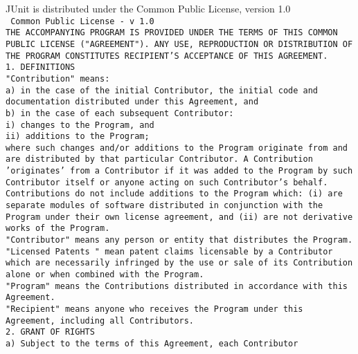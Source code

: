 
\setlength{\baselineskip}{\oldbaselineskip}
\noindent
JUnit is distributed under the Common Public License, version 1.0
\\

\setlength{\baselineskip}{0.5\oldbaselineskip}
{\tiny\tt
\noindent
Common Public License - v 1.0
\\[4pt]
THE ACCOMPANYING PROGRAM IS PROVIDED UNDER THE TERMS OF THIS COMMON
PUBLIC LICENSE ("AGREEMENT"). ANY USE, REPRODUCTION OR DISTRIBUTION OF
THE PROGRAM CONSTITUTES RECIPIENT'S ACCEPTANCE OF THIS AGREEMENT.
\\[4pt]
1. DEFINITIONS
\\[4pt]
"Contribution" means:
\\[4pt]
      a) in the case of the initial Contributor, the initial code and
      documentation distributed under this Agreement, and
\\[4pt]
      b) in the case of each subsequent Contributor:
\\[4pt]
      i) changes to the Program, and
\\[4pt]
      ii) additions to the Program;
\\[4pt]
      where such changes and/or additions to the Program originate
      from and are distributed by that particular Contributor. A
      Contribution 'originates' from a Contributor if it was added to
      the Program by such Contributor itself or anyone acting on such
      Contributor's behalf. Contributions do not include additions to
      the Program which: (i) are separate modules of software
      distributed in conjunction with the Program under their own
      license agreement, and (ii) are not derivative works of the
      Program.
\\[4pt]
"Contributor" means any person or entity that distributes the Program.
\\[4pt]
"Licensed Patents " mean patent claims licensable by a Contributor
which are necessarily infringed by the use or sale of its Contribution
alone or when combined with the Program.
\\[4pt]
"Program" means the Contributions distributed in accordance with this Agreement.
\\[4pt]
"Recipient" means anyone who receives the Program under this
Agreement, including all Contributors.
\\[4pt]
2. GRANT OF RIGHTS
\\[4pt]
      a) Subject to the terms of this Agreement, each Contributor
}
